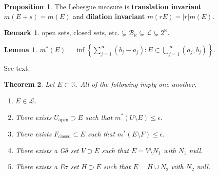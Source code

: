 \documentclass[11pt]{article}
\newtheorem{thm}{Theorem}[section]
\newtheorem{lemma}[thm]{Lemma}
\theoremstyle{definition}
\newtheorem{prop}{Proposition}[section]
\newtheorem{remark}{Remark}[section]
\newcommand{\sm}[0]{\setminus}
\newcommand{\set}[1]{\left\{ #1 \right\}}
\newcommand{\abs}[1]{\left\lvert#1\right\rvert} %
\newcommand{\RR}{\mathbb{R}}
\newcommand{\m}[1]{\mathcal{#1}}
\begin{document}
\begin{prop}
The Lebesgue measure is \textbf{translation invariant} $m(E+s)=m(E)$ and \textbf{dilation
invariant} $m(rE)=\abs{r}m(E)$.
\end{prop}



\begin{remark}
  $\text{open sets, closed sets, etc.}\subsetneq\m{B}_\RR\subsetneq\m{L}\subsetneq2^\RR$. 
\end{remark}

\begin{lemma}
  $m^*(E)=\inf\set{\sum_{j=1}^\infty(b_j-a_j):E\subset\bigcup_{j=1}^\infty(a_j,b_j)}$. 
\end{lemma}
\proof See text. \qedhere

\begin{thm}
  Let $E\subset\RR$. All of the following imply one another. 
  \begin{enumerate}
    \item[(a)] $E\in\m{L}$.
    \item[(b)] There exists $U_\text{open}\supset E$ such that $m^*(U\sm E)\le\epsilon$. 
    \item[(c)] There exists $F_\text{closed}\subset E$ such that $m^*(E\sm F)\le\epsilon$. 
    \item[(d)] There exists a G$\delta$ set $V\supset E$ such that $E=V\sm N_1$ with $N_1$
    null. 
    \item[(e)] There exists a F$\sigma$ set $H\supset E$ such that $E=H\cup N_2$ with $N_2$
    null. 
  \end{enumerate}
\end{thm}
\end{document}
